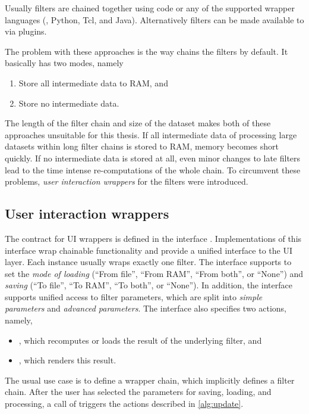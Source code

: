 Usually \vtk filters are chained together using \Cpp code or any of the supported wrapper languages (\eg, Python, Tcl, and Java). Alternatively \vtk filters can be made available to \paraview via plugins.

The problem with these approaches is the way \vtk chains the filters by default. It basically has two modes, namely
%
\begin{enumerate}
	\item Store all intermediate data to \ac{RAM}, and
	\item Store no intermediate data.
\end{enumerate}

The length of the filter chain and size of the dataset makes both of these approaches unsuitable for this thesis. If all intermediate data of processing large datasets within long filter chains is stored to \ac{RAM}, memory becomes short quickly. If no intermediate data is stored at all, even minor changes to late filters lead to the time intense re-computations of the whole chain. To circumvent these problems, \emph{user interaction wrappers} for the filters were introduced.





\subsection{User interaction wrappers}

The contract for \ac{UI} wrappers is defined in the \Cpp interface . Implementations of this interface wrap chainable \vtk functionality and provide a unified interface to the \ac{UI} layer. Each instance usually wraps exactly one \vtk filter. The interface supports to set the \emph{mode of loading} (``From file'', ``From \ac{RAM}'', ``From both'', or ``None'') and \emph{saving} (``To file'', ``To \ac{RAM}'', ``To both'', or ``None''). In addition, the interface supports unified access to filter parameters, which are split into \emph{simple parameters} and \emph{advanced parameters}. The interface also specifies two actions, namely, 
\begin{itemize}
  \item {}, which recomputes or loads the result of the underlying \vtk filter, and 
  \item {}, which renders this result.
\end{itemize}

The usual use case is to define a wrapper chain, which implicitly defines a filter chain. After the user has selected the parameters for saving, loading, and processing, a call of  triggers the actions described in \autoref{alg:update}.


